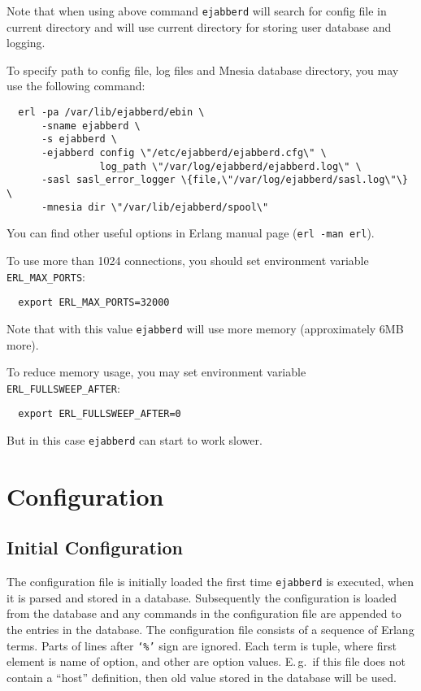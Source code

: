 \documentclass[a4paper,10pt]{article}
\newcommand{\term}[1]{\texttt{#1}}
\newcommand{\shell}[1]{\texttt{#1}}
\newcommand{\ejabberd}{\texttt{ejabberd}}
\begin{document}
Note that when using above command \ejabberd{} will search for config file
in current directory and will use current directory for storing user database
and logging.

To specify path to config file, log files and Mnesia database directory,
you may use the following command:
\begin{verbatim}
  erl -pa /var/lib/ejabberd/ebin \
      -sname ejabberd \
      -s ejabberd \
      -ejabberd config \"/etc/ejabberd/ejabberd.cfg\" \
                log_path \"/var/log/ejabberd/ejabberd.log\" \
      -sasl sasl_error_logger \{file,\"/var/log/ejabberd/sasl.log\"\} \
      -mnesia dir \"/var/lib/ejabberd/spool\"
\end{verbatim}

You can find other useful options in Erlang manual page (\shell{erl -man erl}).

To use more than 1024 connections, you should set environment variable
\verb|ERL_MAX_PORTS|:
\begin{verbatim}
  export ERL_MAX_PORTS=32000
\end{verbatim}
Note that with this value \ejabberd{} will use more memory (approximately 6MB
more).

To reduce memory usage, you may set environment variable
\verb|ERL_FULLSWEEP_AFTER|:
\begin{verbatim}
  export ERL_FULLSWEEP_AFTER=0
\end{verbatim}
But in this case \ejabberd{} can start to work slower.


\section{Configuration}
\label{sec:configuration}

\subsection{Initial Configuration}
\label{sec:initconfig}

%

The configuration file is initially loaded the first time \ejabberd{} is
executed, when it is parsed and stored in a database.  Subsequently the
configuration is loaded from the database and any commands in the configuration
file are appended to the entries in the database.  The configuration file
consists of a sequence of Erlang terms. Parts of lines after \term{`\%'} sign
are ignored.  Each term is tuple, where first element is name of option, and
other are option values. E.\,g.\ if this file does not contain a ``host''
definition, then old value stored in the database will be used.
\end{document}
